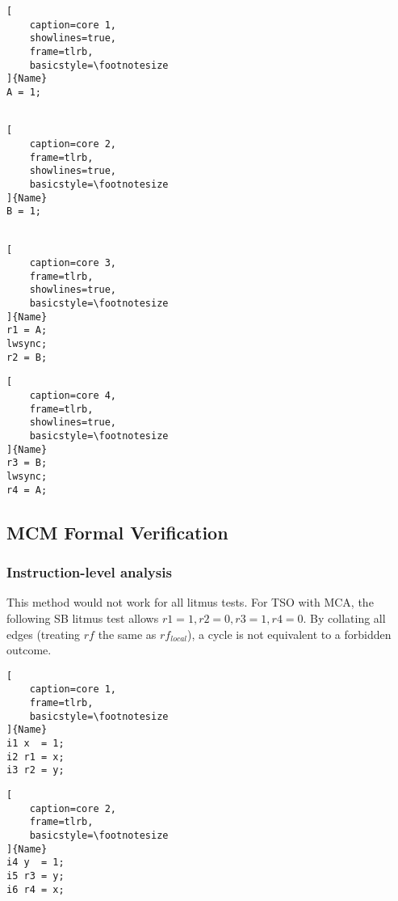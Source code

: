 \documentclass{article}
\begin{document}
\begin{multicols*}{2}
\noindent\begin{minipage}{.11\textwidth}
\captionsetup{labelformat=empty}
\begin{lstlisting}[
    caption=core 1,
    showlines=true,
    frame=tlrb,
    basicstyle=\footnotesize
]{Name}
A = 1;


\end{lstlisting}
\end{minipage}\hfill
\begin{minipage}{.11\textwidth}
\captionsetup{labelformat=empty}
\begin{lstlisting}[
    caption=core 2,
    frame=tlrb,
    showlines=true,
    basicstyle=\footnotesize
]{Name}
B = 1;


\end{lstlisting}
\end{minipage}\hfill
\begin{minipage}{.11\textwidth}
\captionsetup{labelformat=empty}
\begin{lstlisting}[
    caption=core 3,
    frame=tlrb,
    showlines=true,
    basicstyle=\footnotesize
]{Name}
r1 = A;
lwsync;
r2 = B;
\end{lstlisting}
\end{minipage}\hfill
\begin{minipage}{.11\textwidth}
\captionsetup{labelformat=empty}
\begin{lstlisting}[
    caption=core 4,
    frame=tlrb,
    showlines=true,
    basicstyle=\footnotesize
]{Name}
r3 = B;
lwsync;
r4 = A;
\end{lstlisting}
\end{minipage}

\subsection{MCM Formal Verification}

\subsubsection{Instruction-level analysis}
This method would not work for all litmus tests. For TSO with MCA, the following SB litmus test allows $r1=1, r2=0, r3=1, r4=0$. By collating all edges (treating $rf$ the same as $rf_{local}$), a cycle is not equivalent to a forbidden outcome.

\noindent\begin{minipage}{.2\textwidth}
\captionsetup{labelformat=empty}
\begin{lstlisting}[
    caption=core 1,
    frame=tlrb, 
    basicstyle=\footnotesize
]{Name}
i1 x  = 1;
i2 r1 = x;
i3 r2 = y;
\end{lstlisting}
\end{minipage}\hfill
\begin{minipage}{.2\textwidth}
\captionsetup{labelformat=empty}
\begin{lstlisting}[
    caption=core 2,
    frame=tlrb,
    basicstyle=\footnotesize
]{Name}
i4 y  = 1;
i5 r3 = y;
i6 r4 = x;
\end{lstlisting}
\end{minipage}


\end{multicols*}
\end{document}
